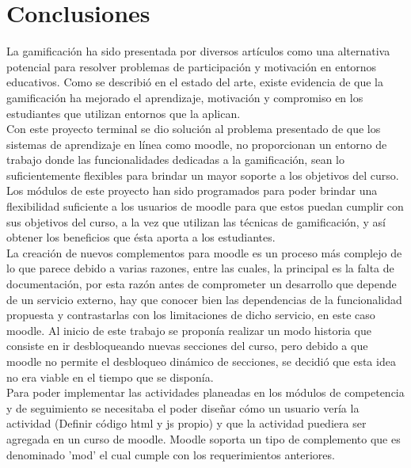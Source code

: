 \chapter{Conclusiones} \label{ch:conclusiones}

\noindent La gamificación ha sido presentada por diversos artículos como una alternativa potencial para resolver problemas de participación
y motivación en entornos educativos. Como se describió  en el estado del arte, existe evidencia de que la gamificación ha mejorado el aprendizaje, motivación
y compromiso en los estudiantes que utilizan entornos que la aplican.\\

\noindent Con este proyecto terminal se dio solución al problema presentado de que los sistemas de aprendizaje en línea como moodle, no proporcionan
un entorno de trabajo donde las funcionalidades dedicadas a la gamificación, sean lo suficientemente flexibles
para brindar un mayor soporte a los objetivos del curso.\\

\noindent Los módulos de este proyecto han sido programados para poder brindar una flexibilidad suficiente 
a los usuarios de moodle para que estos puedan cumplir con sus objetivos del curso, a la vez
que utilizan las técnicas de gamificación, y así obtener los beneficios que ésta aporta a los estudiantes.\\

\noindent La creación de nuevos complementos para moodle es un proceso más complejo de lo que parece debido a
varias razones, entre las cuales, la principal es la falta de documentación, por esta razón antes de comprometer 
un desarrollo que depende de un servicio externo, hay que conocer bien las dependencias de la funcionalidad propuesta y contrastarlas
con los limitaciones de dicho servicio, en este caso moodle. Al inicio de este trabajo se proponía 
realizar un modo historia que consiste en ir desbloqueando nuevas secciones del curso, pero debido 
a que moodle no permite el desbloqueo dinámico de secciones, se decidió que esta idea
no era viable en el tiempo que se disponía.\\


\noindent Para poder implementar las actividades planeadas en los módulos de competencia y de seguimiento se necesitaba el poder diseñar
cómo un usuario vería la actividad (Definir código html y js propio) y que la actividad puediera ser agregada en un curso de moodle. Moodle soporta 
un tipo de complemento que es denominado 'mod' el cual cumple con los requerimientos anteriores.\\

